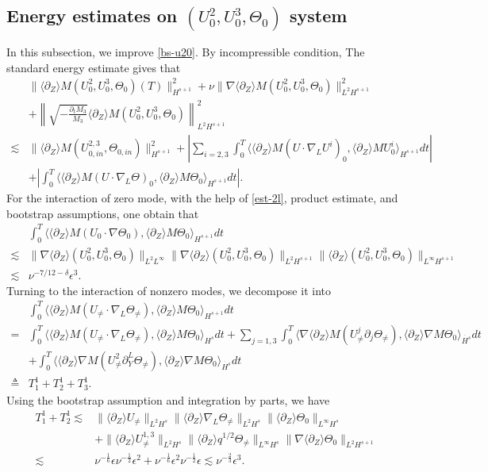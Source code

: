 \documentclass[12pt]{article}
\newcommand{\wtb}{\langle\partial_Z\rangle }
\numberwithin{equation}{section}
\begin{document}
	\subsection{Energy estimates on $(U^2_0,U^3_0,\Theta_0)$ system}
	In this subsection, we improve \eqref{bs-u20}. By incompressible condition, The standard energy estimate gives that
	\begin{align*}
		&\|\wtb M(U^2_0,U^3_0,\Theta_0)(T)\|^2_{H^{s+1}}+\nu \|\nabla\wtb M(U^2_0,U^3_0,\Theta_0)\|^2_{L^2H^{s+1}}\\
        &+\left\|\sqrt{-\frac{\partial_tM_3}{M_3}}\wtb M(U^2_0,U^3_0,\Theta_0)\right\|^2_{L^2H^{s+1}}\\
		\lesssim&\|\wtb M(U^{2,3}_{0,in},\Theta_{0,in})\|^2_{H^{s+1}}+\left|\sum_{i=2,3}\int_{0}^{T}\langle\wtb M(U\cdot\nabla_LU^i)_0,\wtb MU^i_0\rangle_{H^{s+1}}dt\right|\\
		&+\left|\int_{0}^{T}\langle\wtb M(U\cdot\nabla_L\Theta)_0,\wtb M\Theta_0\rangle_{H^{s+1}}dt\right|.
	\end{align*}
	For the interaction of zero mode, with the help of \eqref{est-2l}, product estimate, and bootstrap assumptions, one obtain that
	\begin{align*}
		&\int_{0}^{T}\langle\wtb M(U_0\cdot\nabla\Theta_0),\wtb M\Theta_0\rangle_{H^{s+1}}dt\\
		\lesssim&\| \nabla \wtb (U^2_0,U^3_0,\Theta_0)\|_{L^2L^{\infty}}\|\nabla\wtb (U^2_0,U^3_0,\Theta_0)\|_{L^2H^{s+1}}\|\wtb(U^2_0,U^3_0,\Theta_0)\|_{L^{\infty}H^{s+1}}\\
		\lesssim&\nu^{-7/12 -\delta}\epsilon^3.
	\end{align*}
	Turning to the interaction of nonzero modes, we decompose it into
	\begin{align*}
		&\int_{0}^{T}\langle\wtb M(U_{\neq}\cdot\nabla_L\Theta_{\neq}),\wtb M\Theta_0\rangle_{H^{s+1}}dt\\
		=&\int_{0}^{T}\langle\wtb M(U_{\neq}\cdot\nabla_L\Theta_{\neq}),\wtb M\Theta_0\rangle_{H^{s}}dt+\sum_{j=1,3}\int_{0}^{T}\langle\nabla \wtb M(U^j_{\neq}\partial_j\Theta_{\neq}),\wtb\nabla M\Theta_0\rangle_{\dot{H^{s}}}dt\\
		&+\int_{0}^{T}\langle\wtb \nabla M(U^2_{\neq}\partial_Y^L\Theta_{\neq}),\wtb\nabla M\Theta_0\rangle_{\dot{H^{s}}}dt\\
		\triangleq &T^1_1+T^1_2+T^1_3.
	\end{align*}
	Using the bootstrap assumption and integration by parts, we have
	\begin{align*}
		T^1_1+T^1_2\lesssim&\|\wtb U_{\neq}\|_{L^2H^s}\|\wtb \nabla_L \Theta_{\neq}\|_{L^2H^s}\|\wtb \Theta_0\|_{L^{\infty}H^s}\\
		&+\|\wtb U^{1,3}_{\neq}\|_{L^2H^s}\| \wtb q^{1/2}\Theta_{\neq}\|_{L^{\infty}H^s}\|\nabla\wtb\Theta_0\|_{L^2H^{s+1}}\\
		\lesssim&\nu^{-\frac{1}{6}}\epsilon\nu^{-\frac{1}{2}}\epsilon^2+\nu^{-\frac{1}{6}}\epsilon^2\nu^{-\frac{1}{2}}\epsilon\lesssim\nu^{-\frac{2}{3}}\epsilon^3.
	\end{align*}
\end{document}

